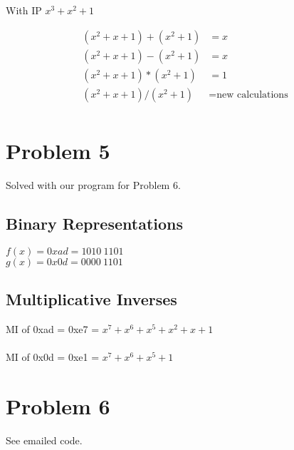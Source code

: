 \documentclass[letterpaper]{article}
\begin{document}
With IP \(x^3 + x^2 + 1\)

\begin{equation*}
  \begin{split}
    (x^2 + x + 1) + (x^2 + 1) &= x \\
    (x^2 + x + 1) - (x^2 + 1) &= x \\
    (x^2 + x + 1) * (x^2 + 1) &= 1 \\
    (x^2 + x + 1) / (x^2 + 1) &= \text{new calculations} \\
  \end{split}
\end{equation*}

\section{Problem 5}

Solved with our program for Problem 6.

\subsection{Binary Representations}

\(f(x) = 0xad = 1010\ 1101\) \\
\(g(x) = 0x0d = 0000\ 1101\) \\

\subsection{Multiplicative Inverses}

MI of 0xad = 0xe7 = \(x^7 + x^6 + x^5 + x^2 + x + 1\)\\
\\
MI of 0x0d = 0xe1 = \(x^7 + x^6 + x^5 + 1\)

\section{Problem 6}

See emailed code.
\end{document}
